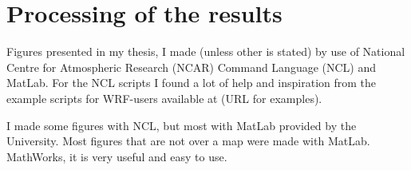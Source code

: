 \section{Processing of the results}
Figures presented in my thesis, I made (unless other is stated) by use of National Centre for Atmospheric Research (NCAR) Command Language (NCL) and MatLab. For the NCL scripts I found a lot of help and inspiration from the example scripts for WRF-users available at (URL for examples).

I made some figures with NCL, but most with MatLab provided by the University. Most figures that are not over a map were made with MatLab. MathWorks, it is very useful and easy to use.